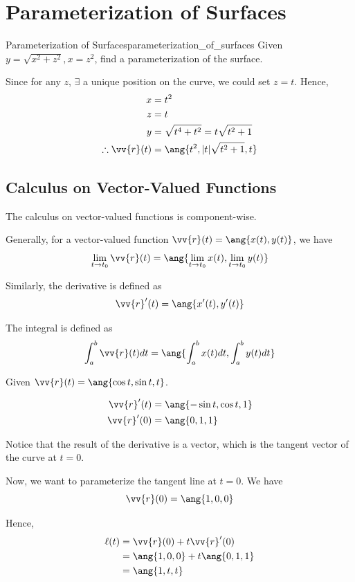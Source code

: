 \section{Parameterization of Surfaces}

\begin{problem}{Parameterization of Surfaces}{parameterization_of_surfaces}
Given $y = \sqrt{x^2 + z^2}, x = z^2$, find a parameterization of the surface.
\end{problem}

\begin{sol}
Since for any $z$, $\exists$ a unique position on the curve, we could set $z = t$.
Hence,
\begin{align*}
    x &= t^2 \\
    z &= t \\
    y &= \sqrt{t^4 + t^2} = t\sqrt{t^2 + 1} \\
    \therefore \vv{r}(t) &= \ang{t^2, |t|\sqrt{t^2 + 1}, t}
\end{align*}

\end{sol}

\subsection{Calculus on Vector-Valued Functions}

The calculus on vector-valued functions is component-wise. 

Generally, for a vector-valued function $\vv{r}(t) = \ang{x(t), y(t)}$, we have
\[
\lim_{t \to t_0} \vv{r}(t) = \ang{\lim_{t \to t_0} x(t), \lim_{t \to t_0} y(t)}
\]

Similarly, the derivative is defined as
\[
\vv{r}'(t) = \ang{x'(t), y'(t)}
\]

The integral is defined as
\[
\int_a^b \vv{r}(t) dt = \ang{\int_a^b x(t) dt, \int_a^b y(t) dt}
\]

\begin{example}
Given $\vv{r}(t) = \ang{\cos t, \sin t, t}$.

\begin{align*}
\vv{r}'(t) &= \ang{-\sin t, \cos t, 1} \\
\vv{r}'(0) &= \ang{0, 1, 1} \\
\end{align*}

Notice that the result of the derivative is a vector, which is the tangent vector of the curve at $t = 0$.


Now, we want to parameterize the tangent line at $t = 0$. We have
\[
\vv{r}(0) = \ang{1, 0, 0}
\]

Hence,
\begin{align*}
\ell(t) &= \vv{r}(0) + t\vv{r}'(0) \\
&= \ang{1, 0, 0} + t\ang{0, 1, 1} \\
&= \ang{1, t, t}
\end{align*}
\end{example}


